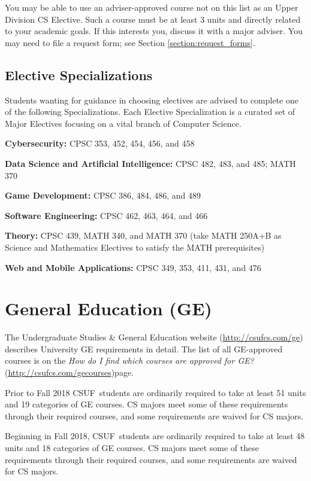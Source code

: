 \documentclass{book}
\newcommand{\CampusName}{CSUF}
\newcommand{\shrunkurl}[1]{\url{http://csufcs.com/#1}}
\begin{document}
You may be able to use an adviser-approved course not on this list as
an Upper Division CS Elective. Such a course must be at least 3 units
and directly related to your academic goals. If this interests you,
discuss it with a major adviser. You may need to file a request
form; see Section \ref{section:request_forms}.

\subsection{Elective Specializations}

Students wanting for guidance in choosing electives are advised to
complete one of the following Specializations. Each Elective
Specialization is a curated set of Major Electives focusing on a vital
branch of Computer Science.

\textbf{Cybersecurity:} CPSC 353, 452, 454, 456, and 458

\textbf{Data Science and Artificial Intelligence:} CPSC 482, 483, and 485; MATH 370

\textbf{Game Development:} CPSC 386, 484, 486, and 489

\textbf{Software Engineering:} CPSC 462, 463, 464, and 466

\textbf{Theory:} CPSC 439, MATH 340, and MATH 370 (take MATH 250A+B as Science and Mathematics Electives to satisfy the MATH prerequisites)

\textbf{Web and Mobile Applications:} CPSC 349, 353, 411, 431, and 476

\section{General Education (GE)}

\newcommand{\gecourselist}{\emph{How do I find which courses are approved for GE?} (\shrunkurl{gecourses})}

The Undergraduate Studies \& General Education website
(\shrunkurl{ge}) describes University GE
requirements in detail. The list of all GE-approved courses is on the
\gecourselist page.

Prior to Fall 2018 \CampusName~students are ordinarily required to
take at least 51 units and 19 categories of GE courses. CS majors meet
some of these requirements through their required courses, and some
requirements are waived for CS majors.

Beginning in Fall 2018, \CampusName~students are ordinarily required
to take at least 48 units and 18 categories of GE courses. CS majors
meet some of these requirements through their required courses, and
some requirements are waived for CS majors.
\end{document}
